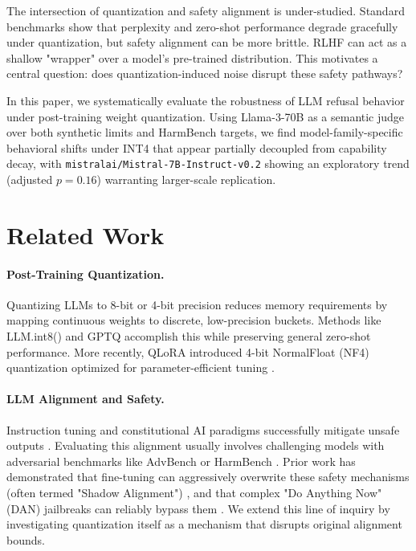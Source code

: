 \documentclass[11pt]{article}
\begin{document}
The intersection of quantization and safety alignment is under-studied. Standard benchmarks show that perplexity and zero-shot performance degrade gracefully under quantization, but safety alignment can be more brittle. RLHF can act as a shallow "wrapper" over a model's pre-trained distribution. This motivates a central question: does quantization-induced noise disrupt these safety pathways?

In this paper, we systematically evaluate the robustness of LLM refusal behavior under post-training weight quantization. Using Llama-3-70B as a semantic judge over both synthetic limits and HarmBench targets, we find model-family-specific behavioral shifts under INT4 that appear partially decoupled from capability decay, with \texttt{mistralai/Mistral-7B-Instruct-v0.2} showing an exploratory trend (adjusted $p=0.16$) warranting larger-scale replication.

\section{Related Work}

\paragraph{Post-Training Quantization.}
Quantizing LLMs to 8-bit or 4-bit precision reduces memory requirements by mapping continuous weights to discrete, low-precision buckets. Methods like \mbox{LLM.int8()} \cite{dettmers2022llmint8} and GPTQ \cite{frantar2022gptq} accomplish this while preserving general zero-shot performance. More recently, QLoRA introduced 4-bit NormalFloat (NF4) quantization optimized for parameter-efficient tuning \cite{dettmers2023qlora}.

\paragraph{LLM Alignment and Safety.}
Instruction tuning and constitutional AI paradigms successfully mitigate unsafe outputs \cite{bai2022constitutional, touvron2023llama2}. Evaluating this alignment usually involves challenging models with adversarial benchmarks like AdvBench or HarmBench \cite{mazeika2024harmbench}. Prior work has demonstrated that fine-tuning can aggressively overwrite these safety mechanisms (often termed "Shadow Alignment") \cite{yang2023shadow}, and that complex "Do Anything Now" (DAN) jailbreaks can reliably bypass them \cite{wei2023jailbroken}. We extend this line of inquiry by investigating quantization itself as a mechanism that disrupts original alignment bounds.
\end{document}
